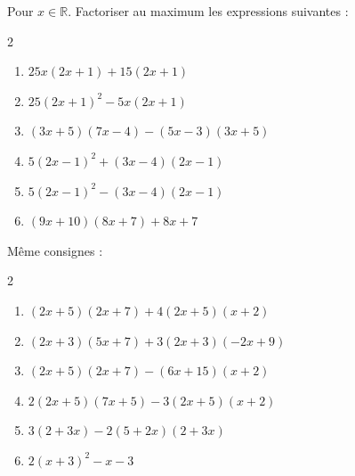 \begin{exercise}  \label{chap02:exo:factoriser:niveau1}
	Pour $x\in\mathbb{R}$. Factoriser au maximum les expressions suivantes : 
	\begin{multicols}{2} 
		\begin{enumerate}[label={$\Alph*(x)=$}, leftmargin=*] 
			\item$25x(2x+1)+15(2x+1)$ 
			\item$25(2x+1)^2-5x(2x+1)$    
			\item $(3x+5)(7x-4)-(5x-3)(3x+5)$ 
			\item$5(2x-1)^2+(3x-4)(2x-1)$
			\item$5(2x-1)^2-(3x-4)(2x-1)$   
			\item $(9x + 10) (8x + 7) + 8x + 7$
		\end{enumerate}
	\end{multicols} 
\end{exercise} 
\begin{exercise}[À vous]\label{chap02:exo:factoriser:niveau2}
  Même consignes :
	\begin{multicols}{2} 
		\begin{enumerate}[label={$\Alph*(x)=$}, leftmargin=*]
			\item $(2x+5)(2x+7)+4(2x+5)(x+2)$ 
			\item $(2x+3)(5x+7)+3(2x+3)(-2x+9) $
			\item $(2x+5)(2x+7)-(6x+15)(x+2)$
			\item $2(2x+5)(7x+5)-3(2x+5)(x+2)$ 
			\item $3(2+3x)-2(5+2x)(2+3x)$  
			\item $2(x+3)^2-x-3$    
		\end{enumerate}
	\end{multicols} 
\end{exercise}
  
